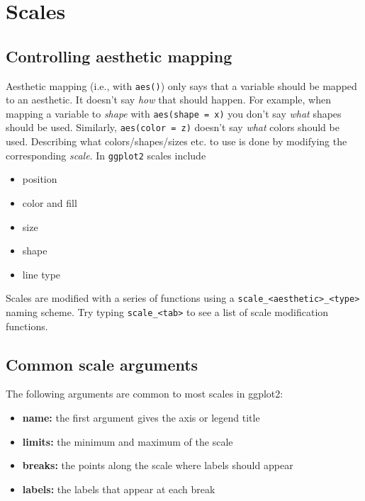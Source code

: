 \documentclass[]{book}
\providecommand{\tightlist}{%
  \setlength{\itemsep}{0pt}\setlength{\parskip}{0pt}}
\begin{document}
\section{Scales}\label{scales}

\subsection{Controlling aesthetic
mapping}\label{controlling-aesthetic-mapping}

Aesthetic mapping (i.e., with \texttt{aes()}) only says that a variable
should be mapped to an aesthetic. It doesn't say \emph{how} that should
happen. For example, when mapping a variable to \emph{shape} with
\texttt{aes(shape\ =\ x)} you don't say \emph{what} shapes should be
used. Similarly, \texttt{aes(color\ =\ z)} doesn't say \emph{what}
colors should be used. Describing what colors/shapes/sizes etc. to use
is done by modifying the corresponding \emph{scale}. In \texttt{ggplot2}
scales include

\begin{itemize}
\tightlist
\item
  position
\item
  color and fill
\item
  size
\item
  shape
\item
  line type
\end{itemize}

Scales are modified with a series of functions using a
\texttt{scale\_\textless{}aesthetic\textgreater{}\_\textless{}type\textgreater{}}
naming scheme. Try typing \texttt{scale\_\textless{}tab\textgreater{}}
to see a list of scale modification functions.

\subsection{Common scale arguments}\label{common-scale-arguments}

The following arguments are common to most scales in ggplot2:

\begin{itemize}
\tightlist
\item
  \textbf{name:} the first argument gives the axis or legend title
\item
  \textbf{limits:} the minimum and maximum of the scale
\item
  \textbf{breaks:} the points along the scale where labels should appear
\item
  \textbf{labels:} the labels that appear at each break
\end{itemize}
\end{document}

